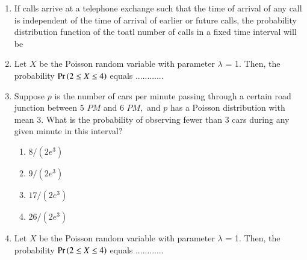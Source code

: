 \renewcommand{\theequation}{\theenumi}
\renewcommand{\thefigure}{\theenumi}
\renewcommand{\thetable}{\theenumi}
\begin{enumerate}[label=\thesection.\arabic*.,ref=\thesection.\theenumi]

\item If calls arrive at a telephone exchange such that the time of arrival of any call is independent of the time of arrival of earlier or future calls, the probability distribution function of the toatl number of calls in a fixed time interval will be

\begin{enumerate}
\end{enumerate}
\solution


%
\item Let $X$ be the Poisson random variable with parameter $\lambda$ = 1. Then, the probability 
$\Pr\left(2 \leq X \leq 4\right)$ equals ............
%
\\
\solution


%
\item  Suppose $p$ is the number of cars per minute passing through a certain road junction between $5$ $PM$ and $6$ $PM,$ and $p$ has a Poisson distribution with mean $3$. What is the probability of observing fewer than $3$ cars during any given minute in this interval$?$
\begin{enumerate}
    \item $8/(2e^3)$
    \item $9/(2e^3)$
    \item $17/(2e^3)$
    \item $26/(2e^3)$
\end{enumerate}
\solution


%
\item Let $X$ be the Poisson random variable with parameter $\lambda$ = 1. Then, the probability 
$\Pr\left(2 \leq X \leq 4\right)$ equals ............
%
\solution



\end{enumerate}
